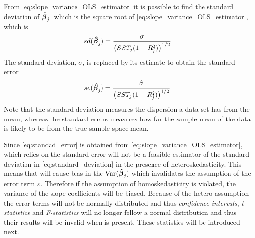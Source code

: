From \eqref{eq:slope_variance_OLS_estimator} it is possible to find the standard deviation of $\operatorname{\boldsymbol{\hat{\beta}}}_j$, which is the square root of \ref{eq:slope_variance_OLS_estimator}, which is
\begin{align}\label{eq:standard_deviation}
    sd(\operatorname{\boldsymbol{\hat{\beta}}}_j) = \dfrac{\sigma}{\left(SST_j(1- R_j^2)\right)^{1/2}}
\end{align}
The standard deviation, $\sigma$, is replaced by its estimate to obtain the standard error
\begin{align}\label{eq:standad_error}
    se(\operatorname{\boldsymbol{\hat{\beta}}}_j) = \dfrac{\hat{\sigma}}{\big(SST_j(1- R_j^2)\big)^{1/2}}
\end{align}
Note that the standard deviation measures the dispersion a data set has from the mean, whereas the standard errors measures how far the sample mean of the data is likely to be from the true sample space mean. 

Since \eqref{eq:standad_error} is obtained from \eqref{eq:slope_variance_OLS_estimator}, which relies on \homo the standard error will not be a feasible estimator of the standard deviation in \eqref{eq:standard_deviation} in the presence of heteroskedasticity. This means that \hetero will cause bias in the $\operatorname{\text{Var}}(\operatorname{\boldsymbol{\hat{\beta}}}_j)$ which invalidates the assumption of the error term $\varepsilon$.
Therefore if the assumption of homoskedasticity is violated, the variance of the slope coefficients will be biased. Because of the hetero assumption the error terms will not be normally distributed and thus \textit{confidence intervals}, \textit{t-statistics} and \textit{F-statistics} will no longer follow a normal distribution and thus their results will be invalid when \hetero is present. These statistics will be introduced next.



























